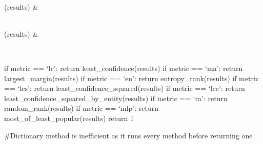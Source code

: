 \documentclass[letterpaper,10pt,english]{sphinxmanual}
\begin{document}
\begin{savenotes}
\begin{longtable}[c]{}
\\
\hline
\sphinxAtStartPar
{\hyperref[\detokenize{autoapi/pine/pipelines/RankingFunctions/index:pine.pipelines.RankingFunctions.random_rank}]{}}(results)
&
\sphinxAtStartPar

\\
\hline
\sphinxAtStartPar
{\hyperref[\detokenize{autoapi/pine/pipelines/RankingFunctions/index:pine.pipelines.RankingFunctions.most_of_least_popular}]{}}(results)
&
\sphinxAtStartPar

\\
\hline
\end{longtable}\sphinxatlongtableend\end{savenotes}

\begin{fulllineitems}
\label{\detokenize{autoapi/pine/pipelines/RankingFunctions/index:pine.pipelines.RankingFunctions.rank}}
\sphinxAtStartPar
if metric == ‘lc’: return least\_confidence(results)
if metric == ‘ma’: return largest\_margin(results)
if metric == ‘en’: return entropy\_rank(results)
if metric == ‘lcs’: return least\_confidence\_squared(results)
if metric == ‘lce’: return least\_confidence\_squared\_by\_entity(results)
if metric == ‘ra’: return random\_rank(results)
if metric == ‘mlp’: return most\_of\_least\_popular(results)
return \sphinxhyphen{}1

\sphinxAtStartPar
\#Dictionary method is inefficient as it runs every method before returning one

\end{fulllineitems}


\begin{fulllineitems}
\label{\detokenize{autoapi/pine/pipelines/RankingFunctions/index:pine.pipelines.RankingFunctions.least_confidence}}
\end{fulllineitems}
\end{document}
